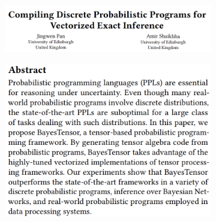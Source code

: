 \documentclass{beamer}
\begin{document}
\begin{frame}
	\frametitle{}
	\vspace{-1em}
	\begin{figure}
		\begin{subfigure}{\textwidth}
			\centering
			\includegraphics[scale=0.4]{imgs/pan_shaikhha.png}
		\end{subfigure}
		\begin{subfigure}{\textwidth}
			\centering
			\includegraphics[scale=0.4]{imgs/pan_shaikhha_abstract.png}
		\end{subfigure}
	\end{figure}
\end{frame}
\end{document}
